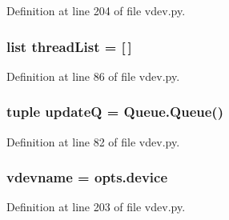 Definition at line 204 of file vdev.\+py.

\subsubsection[{thread\+List}]{\setlength{\rightskip}{0pt plus 5cm}list thread\+List = [$\,$]}\label{namespacevdev_a2ce6f8c570995c6955f92898548bed82}


Definition at line 86 of file vdev.\+py.

\subsubsection[{update\+Q}]{\setlength{\rightskip}{0pt plus 5cm}tuple update\+Q = Queue.\+Queue()}\label{namespacevdev_a520453b0169401faa10a5efdac70708b}


Definition at line 82 of file vdev.\+py.

\subsubsection[{vdevname}]{\setlength{\rightskip}{0pt plus 5cm}vdevname = opts.\+device}\label{namespacevdev_aa192b1e2796072e4610bc18893a8dede}


Definition at line 203 of file vdev.\+py.

